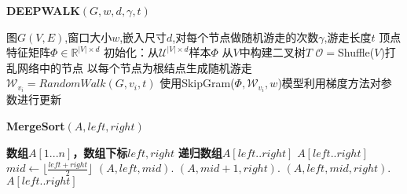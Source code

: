 \documentclass{article}
\begin{document}
\begin{CJK}{UTF8}{gbsn}

\begin{algorithm}
            \caption{\textbf{DEEPWALK$(G,w,d,\gamma ,t)$}}
            \begin{algorithmic}[1] %
                \Require 图$G(V,E)$,窗口大小$w$,嵌入尺寸$d$,对每个节点做随机游走的次数$\gamma$,游走长度$t$
                \Ensure 顶点特征矩阵$\Phi \in \mathbb{R}^{|V|\times d}$
                \State 初始化：从$\mathcal{U}^{|V|\times d}$样本$\Phi$
                \State 从$V$中构建二叉树$T$
                    \State $\mathcal{O}=$Shuffle($V$)打乱网络中的节点
                        \State 以每个节点为根结点生成随机游走 $\mathcal{W}_{v_i}=RandomWalk(G,v_i,t)$
                        \State 使用SkipGram($\Phi ,\mathcal{W}_{v_i},w$)模型利用梯度方法对参数进行更新
                    \EndFor
                \EndFor
                
            \end{algorithmic}
        \end{algorithm}



        \begin{algorithm}
            \caption{\textbf{MergeSort$(A,left,right)$}}
            \begin{algorithmic}[1] %
                \Require \textbf{数组$A[1...n]$，数组下标$left,right$}
                \Ensure \textbf{递归数组$A[left..right]$}
                    \State \Return $A[left..right]$
                \EndIf
                \State $mid \leftarrow \lfloor \frac{left+right}{2} \rfloor$
                \State {}$(A,left,mid)$.
                \State {}$(A,mid+1,right)$.
                \State {}$(A,left,mid,right)$.
                \State \Return $A[left..right]$
            \end{algorithmic}
        \end{algorithm}


\end{CJK}
\end{document}
